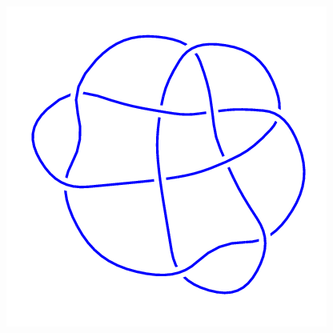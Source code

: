 \begin{figure}[H]
\begin{minipage}[b]{.18\linewidth}
    \end{minipage}
    \begin{minipage}[b]{.18\linewidth}
        \centering
        \includegraphics[width=\linewidth]{../data/10_116.png}
    \end{minipage}
\end{figure}
